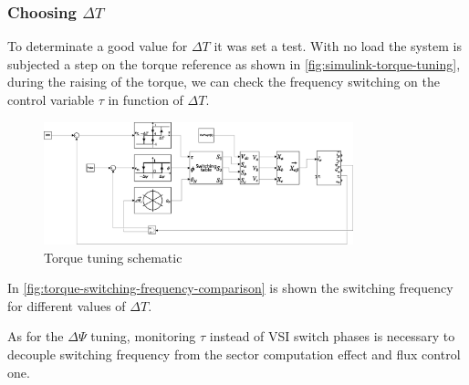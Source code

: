 \subsubsection{Choosing \texorpdfstring{$\Delta T$}{dT}}\label{subsubsec:choosing-delta-t}

To determinate a good value for $\Delta T$ it was set a test.
With no load the system is subjected a step on the torque reference as shown in \autoref{fig:simulink-torque-tuning}, during the raising of the torque, we can check the frequency switching on the control variable $\tau$ in function of $\Delta T$.

\begin{figure}[htbp]
	\centering
	\includegraphics[width=0.8\textwidth]{schematics/torque_tuning}
	\caption{Torque tuning schematic}
	\label{fig:simulink-torque-tuning}
\end{figure}

In \autoref{fig:torque-switching-frequency-comparison} is shown the switching frequency for different values of $\Delta T$.

\begin{nb}
	As for the $\Delta \Psi$ tuning, monitoring $\tau$ instead of VSI switch phases is necessary to decouple switching frequency from the sector computation effect and flux control one.
\end{nb}

